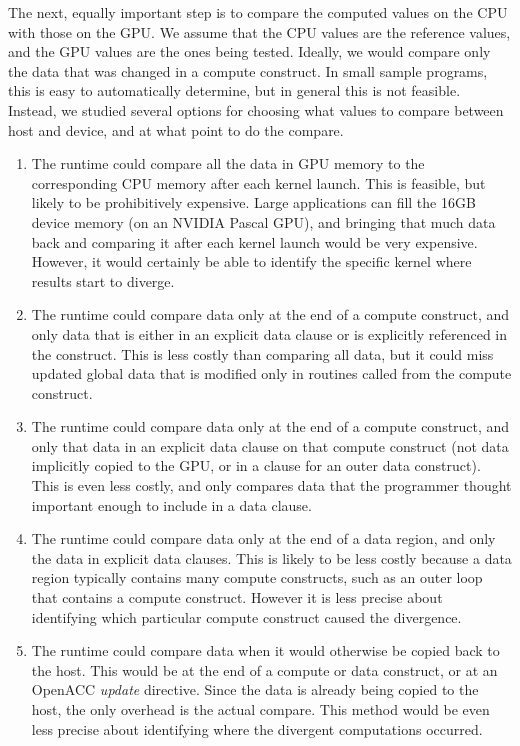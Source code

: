 The next, equally important step is to compare the computed values on the CPU with those on the GPU.
We assume that the CPU values are the reference values, and the GPU values are the ones being tested.
Ideally, we would compare only the data that was changed in a compute construct.
In small sample programs, this is easy to automatically determine, but in general this is not feasible.
Instead, we studied several options for choosing what values to compare between host and device, and at what point to do the compare.
\begin{enumerate}
\item The runtime could compare all the data in GPU memory to the corresponding CPU memory after each kernel launch.
This is feasible, but likely to be prohibitively expensive.
Large applications can fill the 16GB device memory (on an NVIDIA Pascal GPU), and bringing that much data back and comparing it after each kernel launch would be very expensive.
However, it would certainly be able to identify the specific kernel where results start to diverge.

\item The runtime could compare data only at the end of a compute construct, and only data that is either in an explicit data clause or is explicitly referenced in the construct.
This is less costly than comparing all data, but it could miss updated global data that is modified only in routines called from the compute construct.

\item The runtime could compare data only at the end of a compute construct, and only that data in an explicit data clause on that compute construct (not data implicitly copied to the GPU, or in a clause for an outer data construct).
This is even less costly, and only compares data that the programmer thought important enough to include in a data clause.

\item The runtime could compare data only at the end of a data region, and only the data in explicit data clauses.
This is likely to be less costly because a data region typically contains many compute constructs, such as an outer loop that contains a compute construct.
However it is less precise about identifying which particular compute construct caused the divergence.

\item The runtime could compare data when it would otherwise be copied back to the host.
This would be at the end of a compute or data construct, or at an OpenACC \emph{update} directive.
Since the data is already being copied to the host, the only overhead is the actual compare.
This method would be even less precise about identifying where the divergent computations occurred.


\end{enumerate}

